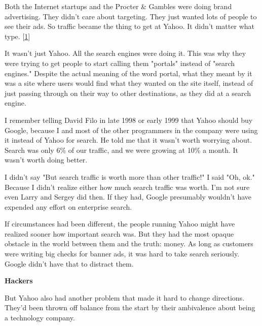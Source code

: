Both
                    the Internet startups and the Procter \& Gambles were doing
                    brand advertising. They didn't care about targeting. They
                    just wanted lots of people to see their ads. So traffic
                    became the thing to get at Yahoo. It didn't matter what
                    type.
                    [\href{\#f1n}{1}]

It wasn't just Yahoo. All the search engines
                    were doing it. This was why they were trying to get people
                    to start calling them "portals" instead of "search engines."
                    Despite the actual meaning of the word portal, what they
                    meant by it was a site where users would find what they
                    wanted on the site itself, instead of just passing through
                    on their way to other destinations, as they did at a search
                    engine.

I remember telling David Filo in late
                    1998 or early 1999 that Yahoo should buy Google, because I
                    and most of the other programmers in the company were using
                    it instead of Yahoo for search. He told me that it wasn't
                    worth worrying about. Search was only 6\% of our traffic, and
                    we were growing at 10\% a month. It wasn't worth doing
                    better.

I didn't say "But search traffic is worth
                    more than other traffic!" I said "Oh, ok." Because I didn't
                    realize either how much search traffic was worth. I'm not
                    sure even Larry and Sergey did then. If they had, Google
                    presumably wouldn't have expended any effort on enterprise
                    search.

If circumstances had been different, the
                    people running Yahoo might have realized sooner how
                    important search was. But they had the most opaque obstacle
                    in the world between them and the truth: money. As long as
                    customers were writing big checks for banner ads, it was
                    hard to take search seriously. Google didn't have that to
                    distract them.

\textbf{Hackers}

But
                    Yahoo also had another problem that made it hard to change
                    directions. They'd been thrown off balance from the start by
                    their ambivalence about being a technology company.

